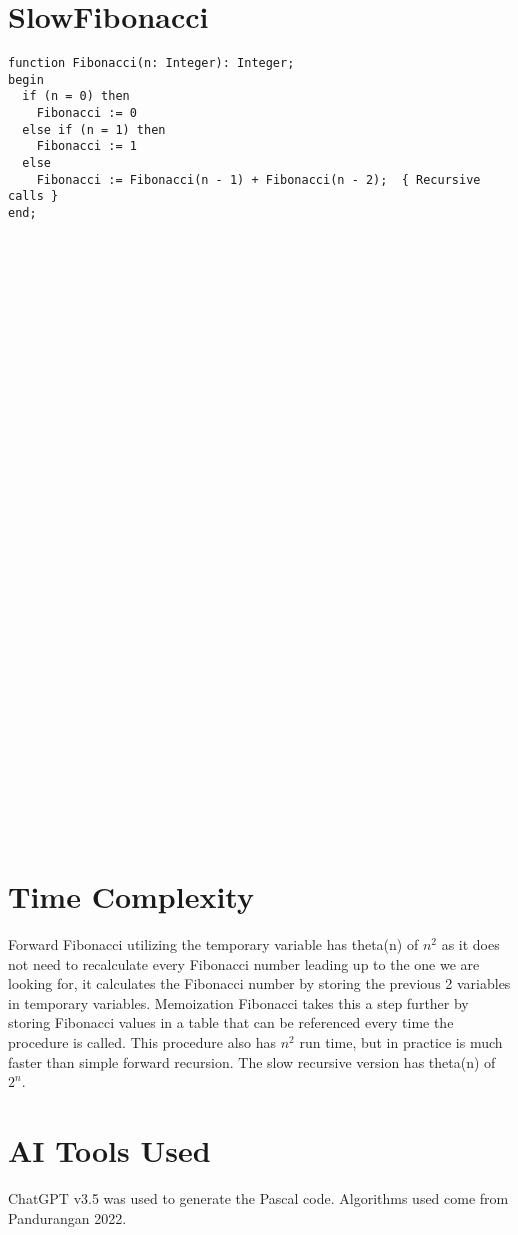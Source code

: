 \documentclass[conference]{IEEEtran}
\begin{document}
\section{SlowFibonacci}
\begin{verbatim}
function Fibonacci(n: Integer): Integer;
begin
  if (n = 0) then
    Fibonacci := 0
  else if (n = 1) then
    Fibonacci := 1
  else
    Fibonacci := Fibonacci(n - 1) + Fibonacci(n - 2);  { Recursive calls }
end;






































\end{verbatim}


\section{Time Complexity}
Forward Fibonacci utilizing the temporary variable has theta(n) of $n^2$ as it does not need to recalculate every Fibonacci number leading up to the one we are looking for, it calculates the Fibonacci number by storing the previous 2 variables in temporary variables. Memoization Fibonacci takes this a step further by storing Fibonacci values in a table that can be referenced every time the procedure is called. This procedure also has $n^2$ run time, but in practice is much faster than simple forward recursion. The slow recursive version has theta(n) of $2^n$.

\section{AI Tools Used}
ChatGPT v3.5 was used to generate the Pascal code. Algorithms used come from Pandurangan 2022.
\end{document}
